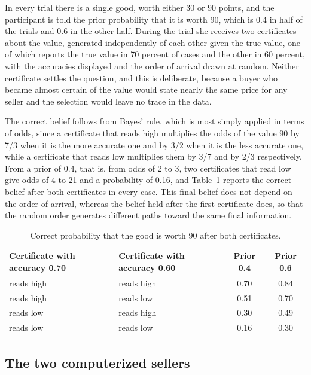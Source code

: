 \documentclass[11pt,a4paper]{article}
\begin{document}
In every trial there is a single good, worth either 30 or 90 points, and the participant is told the prior probability that it is worth 90, which is 0.4 in half of the trials and 0.6 in the other half. During the trial she receives two certificates about the value, generated independently of each other given the true value, one of which reports the true value in 70 percent of cases and the other in 60 percent, with the accuracies displayed and the order of arrival drawn at random. Neither certificate settles the question, and this is deliberate, because a buyer who became almost certain of the value would state nearly the same price for any seller and the selection would leave no trace in the data.

The correct belief follows from Bayes' rule, which is most simply applied in terms of odds, since a certificate that reads high multiplies the odds of the value 90 by 7/3 when it is the more accurate one and by 3/2 when it is the less accurate one, while a certificate that reads low multiplies them by 3/7 and by 2/3 respectively. From a prior of 0.4, that is, from odds of 2 to 3, two certificates that read low give odds of 4 to 21 and a probability of 0.16, and Table~\ref{tab:posteriors} reports the correct belief after both certificates in every case. This final belief does not depend on the order of arrival, whereas the belief held after the first certificate does, so that the random order generates different paths toward the same final information.

\begin{table}[H]
\centering
\begin{tabular}{@{}llcc@{}}
\toprule
Certificate with accuracy 0.70 & Certificate with accuracy 0.60 & Prior 0.4 & Prior 0.6\\
\midrule
reads high & reads high & 0.70 & 0.84\\
reads high & reads low & 0.51 & 0.70\\
reads low & reads high & 0.30 & 0.49\\
reads low & reads low & 0.16 & 0.30\\
\bottomrule
\end{tabular}
\caption{Correct probability that the good is worth 90 after both certificates.}
\label{tab:posteriors}
\end{table}

\subsection{The two computerized sellers}
\end{document}
